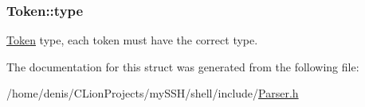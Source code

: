 \subsubsection[{\texorpdfstring{type}{type}}]{ Token\+::type}\hypertarget{structToken_a789b6f0ef869794e8edeaff2d1f67cc5}{}\label{structToken_a789b6f0ef869794e8edeaff2d1f67cc5}


\hyperlink{structToken}{Token} type, each token must have the correct type. 



The documentation for this struct was generated from the following file\+:\begin{DoxyCompactItemize}
\item 
/home/denis/\+C\+Lion\+Projects/my\+S\+S\+H/shell/include/\hyperlink{Parser_8h}{Parser.\+h}\end{DoxyCompactItemize}
